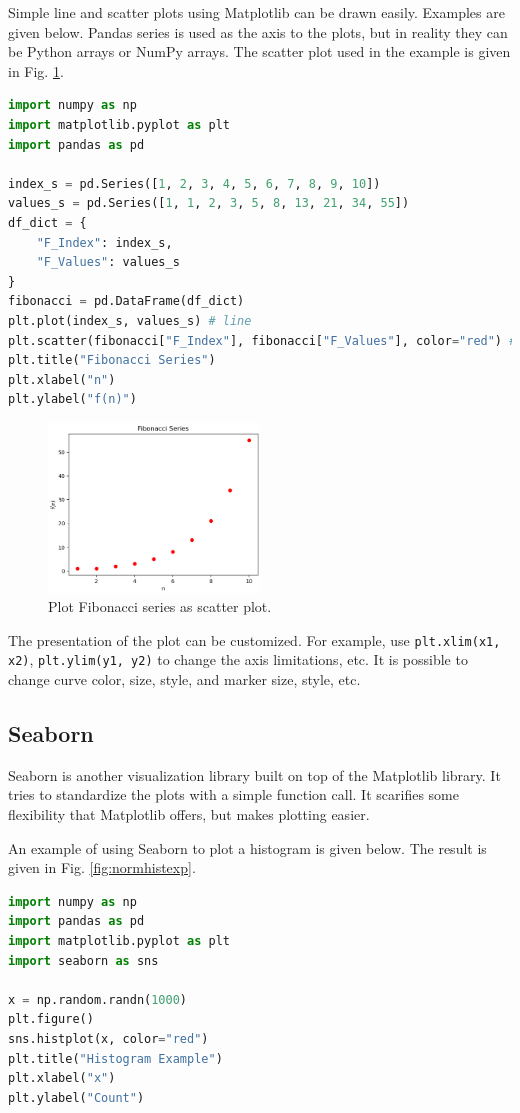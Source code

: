 Simple line and scatter plots using Matplotlib can be drawn easily. Examples are given below. Pandas series is used as the axis to the plots, but in reality they can be Python arrays or NumPy arrays. The scatter plot used in the example is given in Fig. \ref{fig:fib_exp}.
\begin{lstlisting}[language=Python]
import numpy as np
import matplotlib.pyplot as plt
import pandas as pd

index_s = pd.Series([1, 2, 3, 4, 5, 6, 7, 8, 9, 10])
values_s = pd.Series([1, 1, 2, 3, 5, 8, 13, 21, 34, 55])
df_dict = {
	"F_Index": index_s,
	"F_Values": values_s
}
fibonacci = pd.DataFrame(df_dict)
plt.plot(index_s, values_s) # line
plt.scatter(fibonacci["F_Index"], fibonacci["F_Values"], color="red") # scatter
plt.title("Fibonacci Series")
plt.xlabel("n")
plt.ylabel("f(n)")
\end{lstlisting}

\begin{figure}[htbp]
\centering
\includegraphics[width=0.5\textwidth]{chapters/part-3/figures/fib_exp.png}
\caption{Plot Fibonacci series as scatter plot.}
\label{fig:fib_exp}
\end{figure}

The presentation of the plot can be customized. For example, use \verb|plt.xlim(x1, x2)|, \verb|plt.ylim(y1, y2)| to change the axis limitations, etc. It is possible to change curve color, size, style, and marker size, style, etc.

\subsection{Seaborn}

Seaborn is another visualization library built on top of the Matplotlib library. It tries to standardize the plots with a simple function call. It scarifies some flexibility that Matplotlib offers, but makes plotting easier.

An example of using Seaborn to plot a histogram is given below. The result is given in Fig. \ref{fig:normhistexp}.
\begin{lstlisting}[language=Python]
import numpy as np
import pandas as pd
import matplotlib.pyplot as plt
import seaborn as sns

x = np.random.randn(1000)
plt.figure()
sns.histplot(x, color="red")
plt.title("Histogram Example")
plt.xlabel("x")
plt.ylabel("Count")
\end{lstlisting}

